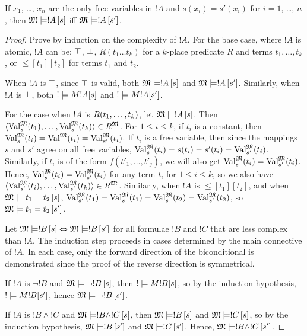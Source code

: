 \documentclass[open-logic-section]{subfiles}
\begin{document}
\begin{prop}
If $x_1$, \dots, $x_n$ are the only free variables in $!A$ and $s(x_i)
= s'(x_i)$ for $i = 1$, \dots, $n$, then $\Sat{M}{!A}[s]$ iff
$\Sat{M}{!A}[s']$.
\end{prop}

\begin{proof}

Prove by induction on the complexity of $!A$. For the base case, where
$!A$ is atomic, $!A$ can be: $\top$, $\bot$, $R(t_1 \ldots t_k)$
for a $k$-place predicate $R$ and terms $t_1,\ldots,t_k$, or
$\leq[t_1][t_2]$ for terms $t_1$ and $t_2$.

When $!A$ is $\top$, since $\top$ is valid, both $\Sat{M}{!A}[s]$
and $\Sat{M}{!A}[s']$. Similarly, when $!A$ is $\bot$, both
$\Sat!{M}{!A}[s]$ and $\Sat!{M}{!A}[s']$.

For the case when $!A$ is ${ R(t_1, \ldots, t_k) }$, let
$\Sat{M}{!A}[s]$. Then $\langle \Value{t_1}{M}[s], \ldots,
\Value{t_k}{M}[s] \rangle \in \Assign{R}{M}$. For $1 \leq i \leq k$,
if $t_i$ is a constant, then $\Value{t_i}{M}[s] = \Value{t_i}{M} =
\Value{t_i}{M}[s']$. If $t_i$ is a free variable, then since the
mappings $s$ and $s'$ agree on all free variables, $\Value{t_i}{M}[s]
= s(t_i) = s'(t_i) = \Value{t_i}{M}[s']$. Similarly, if $t_i$ is of
the form $f(t'_1,\ldots,t'_j)$, we will also get $\Value{t_i}{M}[s] =
\Value{t_i}{M}[s']$. Hence, $\Value{t_i}{M}[s] = \Value{t_i}{M}[s']$
for any term $t_i$ for $1 \leq i \leq k$, so we also have $\langle
\Value{t_i}{M}[s'], \ldots, \Value{t_k}{M}[s'] \rangle \in
\Assign{R}{M}$. Similarly, when $!A$ is $\leq[t_1][t_2]$, and when
$\Sat{M}{\leq[t_1][t_2]}[s]$, $\Value{t_1}{M}[s'] = \Value{t_1}{M}[s] =
\Value{t_2}{M}[s] = \Value{t_2}{M}[s']$, so $\Sat{M}{\leq[t_1][t_2]}[s']$.

Let $\Sat{M}{!B}[s] \Leftrightarrow \Sat{M}{!B}[s']$ for all formulae
$!B$ and $!C$ that are less complex than $!A$. The induction step
proceeds in cases determined by the main connective of $!A$. In each
case, only the forward direction of the biconditional is demonstrated
since the proof of the reverse direction is symmetrical.

If $!A$ is $\lnot !B$ and $\Sat{M}{\lnot !B}[s]$, then
$\Sat!{M}{!B}[s]$, so by the induction hypothesis, $\Sat!{M}{!B}[s']$,
hence $\Sat{M}{\lnot !B}[s']$.

If $!A$ is $!B \land !C$ and $\Sat{M}{!B \land !C}[s]$, then
$\Sat{M}{!B}[s]$ and $\Sat{M}{!C}[s]$, so by the induction hypothesis,
$\Sat{M}{!B}[s']$ and $\Sat{M}{!C}[s']$. Hence, $\Sat{M}{!B \land
  !C}[s']$.


\end{proof}
\end{document}
